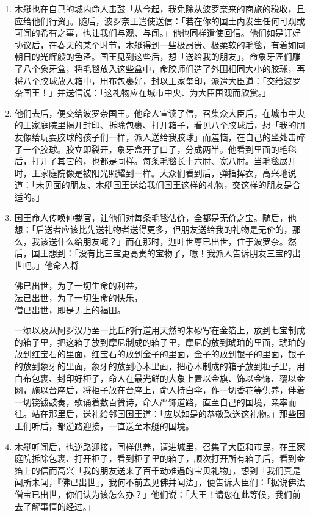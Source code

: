 \begin{enumerate}
\item 木艇也在自己的城内命人击鼓「从今起，我免除从波罗奈来的商旅的税收，且应给他们行资」。随后，波罗奈王遣使送信：「若在你的国土内发生任何可观或可闻的希有之事，也让我们与观、与闻。」他也同样遣使回信。他们如是订好协议后，在春天的某个时节，木艇得到一些极昂贵、极柔软的毛毯，有着如同朝日的光辉般的色泽。国王见到这些后，想「送给我的朋友」，命象牙匠们雕了八个象牙盒，将毛毯放入这些盒中，命胶师们造了外围相同大小的胶球，再将八个胶球放入箱中，用布包裹好，封以王家玺印，派遣大臣道：「交给波罗奈国王！」并送信说：「这礼物应在城市中央、为大臣围观而欣赏。」
\item 他们去后，便交给波罗奈国王。他命人宣读了信，召集众大臣后，在城市中央的王家庭院里揭开封印、拆除包裹、打开箱子，看见八个胶球后，想「我的朋友像给玩耍胶球的孩子们一样，派人送给我胶球」而羞恼，在自己的坐处击碎了一个胶球。胶立即裂开，象牙盒开了口子，分成两半。他看到里面的毛毯后，打开了其它的，也都是同样。每条毛毯长十六肘、宽八肘。当毛毯展开时，王家庭院像是被阳光照耀到一样。大众们看到后，弹指挥衣，高兴地说道：「未见面的朋友、木艇国王送给我们国王这样的礼物，交这样的朋友是合适的。」
\item 国王命人传唤仲裁官，让他们对每条毛毯估价，全都是无价之宝。随后，他想：「后送者应该比先送礼物者送得更多，但朋友送给我的礼物是无价的，那么，我该送什么给朋友呢？」而在那时，迦叶世尊已出世，住于波罗奈。然后，国王想到：「没有比三宝更高贵的宝物了，噫！我派人告诉朋友三宝的出世吧。」他命人将\begin{quoting}佛已出世，为了一切生命的利益，\\法已出世，为了一切生命的快乐，\\僧已出世，即是无上的福田。\end{quoting}一颂以及从阿罗汉乃至一比丘的行道用天然的朱砂写在金箔上，放到七宝制成的箱子里，把这箱子放到摩尼制成的箱子里，摩尼的放到琥珀的里面，琥珀的放到红宝石的里面，红宝石的放到金子的里面，金子的放到银子的里面，银子的放到象牙的里面，象牙的放到心木里面，把心木制成的箱子放到柜子里，用白布包裹、封印好柜子，命人在最光鲜的大象上置以金旗、饰以金饰、覆以金网，施以台座后，将柜子放在台座上，命人持白伞，作一切香花等供养，伴着一切铙钹鼓奏，歌诵着数百赞诗，命人严饰道路，直至自己的国境，亲率而往。站在那里后，送礼给邻国国王道：「应以如是的恭敬致送这礼物。」那些国王们听后，都逆路迎接，一直送至木艇的国境。
\item 木艇听闻后，也逆路迎接，同样供养，请进城里，召集了大臣和市民，在王家庭院拆除包裹、打开柜子，看到柜子里的箱子，顺次打开所有箱子后，看到金箔上的信而高兴「我的朋友送来了百千劫难遇的宝贝礼物」，想到「我们真是闻所未闻，『佛已出世』，我何不前去见佛并闻法」，便告诉大臣们：「据说佛法僧宝已出世，你们认为该怎么办？」他们说：「大王！请您在此等候，我们前去了解事情的经过。」

\end{enumerate}
